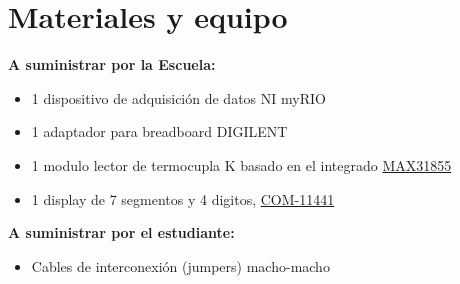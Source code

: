\documentclass[12pt,letterpaper]{report}
\newcommand{\mat}{Materiales y equipo}
\begin{document}
\section{\mat}
\textbf{A suministrar por la Escuela:}
\begin{itemize}
\item 1 dispositivo de adquisición de datos NI myRIO
\item 1 adaptador para breadboard DIGILENT
\item 1 modulo lector de termocupla K basado en el integrado \href{https://datasheets.maximintegrated.com/en/ds/MAX31855.pdf}{MAX31855}
\item 1 display de 7 segmentos y 4 digitos, \href{https://github.com/sparkfun/Serial7SegmentDisplay/wiki/Serial-7-Segment-Display-Datasheet}{COM-11441}

\end{itemize}
\textbf{A suministrar por el estudiante:}
\begin{itemize}
\item Cables de interconexión (jumpers) macho-macho
\end{itemize}
\end{document}
